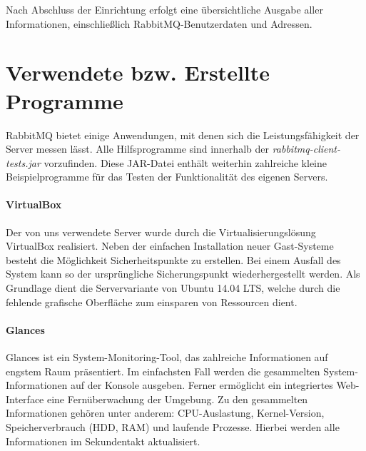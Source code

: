 \documentclass[	a4paper,
			11pt,
			titlepage,
			oneside,
			fleqn,
			listof=totoc,
			parskip,
			numbers=noenddot]{scrartcl}
\begin{document}
	Nach Abschluss der Einrichtung erfolgt eine übersichtliche Ausgabe aller Informationen, einschließlich RabbitMQ-Benutzerdaten und Adressen.

	
	


%	
%
\clearpage
\section*{Verwendete bzw. Erstellte Programme}
	
	RabbitMQ bietet einige Anwendungen, mit denen sich die Leistungsfähigkeit der Server messen lässt. Alle Hilfsprogramme sind innerhalb der \textit{rabbitmq-client-tests.jar} vorzufinden. Diese JAR-Datei enthält weiterhin zahlreiche kleine Beispielprogramme für das Testen der Funktionalität des eigenen Servers. 
	
	\paragraph{VirtualBox} Der von uns verwendete Server wurde durch die Virtualisierungslösung VirtualBox realisiert. Neben der einfachen Installation neuer Gast-Systeme besteht die Möglichkeit Sicherheitspunkte zu erstellen. Bei einem Ausfall des System kann so der ursprüngliche Sicherungspunkt wiederhergestellt werden. Als Grundlage dient die Servervariante von Ubuntu 14.04 LTS, welche durch die fehlende grafische Oberfläche zum einsparen von Ressourcen dient.
	
	\paragraph{Glances} Glances ist ein System-Monitoring-Tool, das zahlreiche Informationen auf engstem Raum präsentiert. Im einfachsten Fall werden die gesammelten System-Informationen auf der Konsole ausgeben. Ferner ermöglicht ein integriertes Web-Interface eine Fernüberwachung der Umgebung. Zu den gesammelten Informationen gehören unter anderem: CPU-Auslastung, Kernel-Version, Speicherverbrauch (HDD, RAM) und laufende Prozesse. Hierbei werden alle Informationen im Sekundentakt aktualisiert.
	
\end{document}
